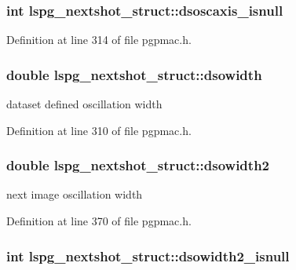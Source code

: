 \hypertarget{structlspg__nextshot__struct_a51a26391afcacfb4c946fb9e8e9ab6b0}{
\subsubsection[{dsoscaxis\-\_\-isnull}]{\setlength{\rightskip}{0pt plus 5cm}int lspg\-\_\-nextshot\-\_\-struct\-::dsoscaxis\-\_\-isnull}}\label{structlspg__nextshot__struct_a51a26391afcacfb4c946fb9e8e9ab6b0}


Definition at line 314 of file pgpmac.\-h.

\hypertarget{structlspg__nextshot__struct_ad5a8f568a04aa6a13767933062b28f19}{
\subsubsection[{dsowidth}]{\setlength{\rightskip}{0pt plus 5cm}double lspg\-\_\-nextshot\-\_\-struct\-::dsowidth}}\label{structlspg__nextshot__struct_ad5a8f568a04aa6a13767933062b28f19}


dataset defined oscillation width 



Definition at line 310 of file pgpmac.\-h.

\hypertarget{structlspg__nextshot__struct_a5378e13735a5392a9fcd853ce8c9e929}{
\subsubsection[{dsowidth2}]{\setlength{\rightskip}{0pt plus 5cm}double lspg\-\_\-nextshot\-\_\-struct\-::dsowidth2}}\label{structlspg__nextshot__struct_a5378e13735a5392a9fcd853ce8c9e929}


next image oscillation width 



Definition at line 370 of file pgpmac.\-h.

\hypertarget{structlspg__nextshot__struct_a5ffd27b8063506fd54162658e5c2ce8a}{
\subsubsection[{dsowidth2\-\_\-isnull}]{\setlength{\rightskip}{0pt plus 5cm}int lspg\-\_\-nextshot\-\_\-struct\-::dsowidth2\-\_\-isnull}}\label{structlspg__nextshot__struct_a5ffd27b8063506fd54162658e5c2ce8a}


